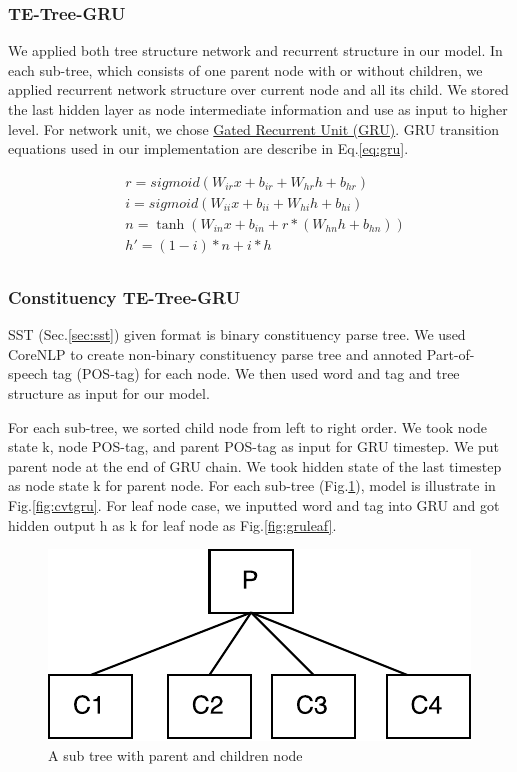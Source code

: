 \subsubsection{TE-Tree-GRU}
We applied both tree structure network and recurrent structure in our model. 
In each sub-tree, which consists of one parent node with or without children, we applied recurrent network structure over current node and all its child. 
We stored the last hidden layer as node intermediate information and use as input to higher level. 
For network unit, we chose \hyperref[sec:GRU]{Gated Recurrent Unit (GRU)}\cite{cho2014learning}. 
GRU transition equations used in our implementation are describe in Eq.\ref{eq:gru}. 

\begin{equation}
\label{eq:gru}
\begin{aligned}
&r = sigmoid(W_{ir} x + b_{ir} + W_{hr} h + b_{hr}) \\
&i = sigmoid(W_{ii} x + b_{ii} + W_{hi} h + b_{hi}) \\
&n = \tanh(W_{in} x + b_{in} + r * (W_{hn} h + b_{hn})) \\
&h' = (1 - i) * n + i * h\\
\end{aligned}
\end{equation}

\subsubsection{Constituency TE-Tree-GRU} \label{sec:VTtreeConstituency}
SST (Sec.\ref{sec:sst}) given format is binary constituency parse tree. We used CoreNLP \cite{manning2014stanford} to create non-binary constituency parse tree and annoted Part-of-speech tag (POS-tag) for each node. We then used word and tag and tree structure as input for our model.

For each sub-tree, we sorted child node from left to right order. We took node state k, node POS-tag, and parent POS-tag as input for GRU timestep. We put parent node at the end of GRU chain. We took hidden state of the last timestep as node state k for parent node. For each sub-tree (Fig.\ref{fig:treecp}), model is illustrate in Fig.\ref{fig:cvtgru}. For leaf node case, we inputted word and tag into GRU and got hidden output h as k for leaf node as Fig.\ref{fig:gruleaf}.
\begin{figure}[H]
    \centering
    \includegraphics[width=0.5\linewidth]{figure/treecp}
    \caption[A sub tree with parent and children node]{A sub tree with parent and children node}
    \label{fig:treecp}
\end{figure}

